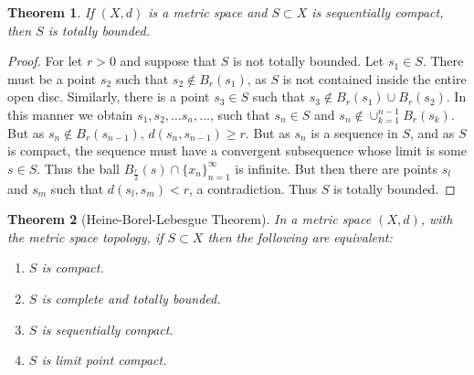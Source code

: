 \documentclass[crop=false,class=book]{standalone}
\theoremstyle{mystyle}
\newtheorem{theorem}{Theorem}[section]
\begin{document}
\begin{theorem}
If $(X,d)$ is a metric space and $S\subset X$ is sequentially compact, then $S$ is totally bounded.
\end{theorem}
\begin{proof}
For let $r>0$ and suppose that $S$ is not totally bounded. Let $s_1\in S$. There must be a point $s_2$ such that $s_2 \notin B_{r}(s_1)$, as $S$ is not contained inside the entire open disc. Similarly, there is a point $s_3\in S$ such that $s_3 \notin B_r(s_1)\cup B_r(s_2)$. In this manner we obtain $s_1, s_2, \hdots s_n, \hdots$, such that $s_n \in S$ and $s_n \notin \cup_{k=1}^{n-1}B_r(s_k)$. But as $s_n \notin B_r(s_{n-1})$, $d(s_n, s_{n-1})\geq r$. But as $s_n$ is a sequence in $S$, and as $S$ is compact, the sequence must have a convergent subsequence whose limit is some $s\in S$. Thus the ball $B_{\frac{r}{2}}(s)\cap \{x_n\}_{n=1}^{\infty}$ is infinite. But then there are points $s_{l}$ and $s_{m}$ such that $d(s_l,s_m)<r$, a contradiction. Thus $S$ is totally bounded.
\end{proof}
\begin{theorem}[Heine-Borel-Lebesgue Theorem]
In a metric space $(X,d)$, with the metric space topology, if $S\subset X$ then the following are equivalent:
\begin{enumerate}
\item $S$ is compact.
\item $S$ is complete and totally bounded.
\item $S$ is sequentially compact.
\item $S$ is limit point compact.
\end{enumerate}
\end{theorem}
\end{document}
